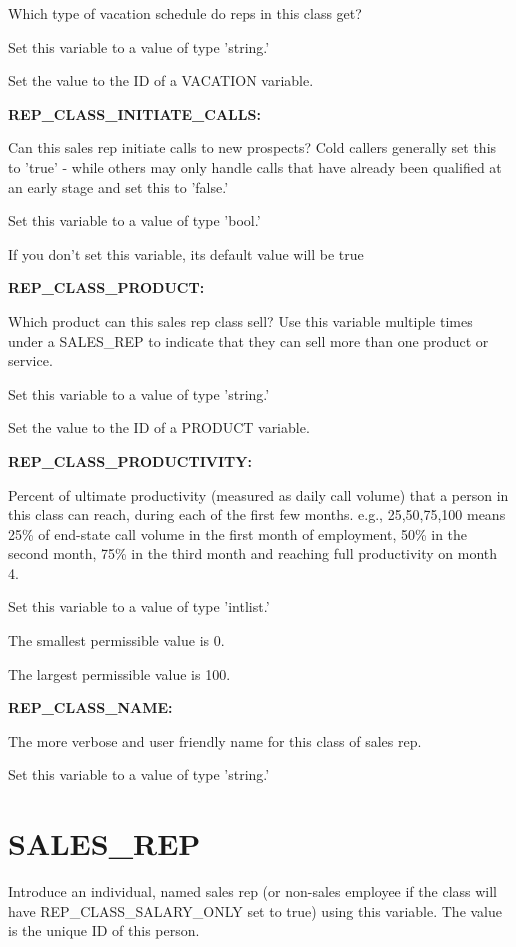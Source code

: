 Which type of vacation schedule do reps in this class get?

Set this variable to a value of type 'string.'

Set the value to the ID of a VACATION variable.


\textbf{REP\_CLASS\_INITIATE\_CALLS:}


Can this sales rep initiate calls to new prospects?  Cold callers generally set this to 'true' - while others may only handle calls that have already been qualified at an early stage and set this to 'false.'

Set this variable to a value of type 'bool.'

If you don't set this variable, its default value will be true


\textbf{REP\_CLASS\_PRODUCT:}


Which product can this sales rep class sell?  Use this variable multiple times under a SALES\_REP to indicate that they can sell more than one product or service.

Set this variable to a value of type 'string.'

Set the value to the ID of a PRODUCT variable.


\textbf{REP\_CLASS\_PRODUCTIVITY:}


Percent of ultimate productivity (measured as daily call volume) that a person in this class can reach, during each of the first few months.  e.g., 25,50,75,100 means 25\% of end-state call volume in the first month of employment, 50\% in the second month, 75\% in the third month and reaching full productivity on month 4.

Set this variable to a value of type 'intlist.'

The smallest permissible value is 0.

The largest permissible value is 100.


\textbf{REP\_CLASS\_NAME:}


The more verbose and user friendly name for this class of sales rep.

Set this variable to a value of type 'string.'


\section{SALES\_REP}


Introduce an individual, named sales rep (or non-sales employee if the class will have REP\_CLASS\_SALARY\_ONLY set to true) using this variable.  The value is the unique ID of this person.

